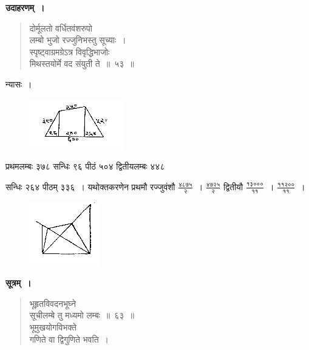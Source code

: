 \documentclass[11pt, openany]{book}
\begin{document}
 \textbf{उदाहरणम्~।} 
\begin{quote}
    \bqt 
दोर्मूलतो वर्धितवंशरुपो \\
लम्बो भुजो रज्जुनिभस्तु सूच्याः~।\\
स्पृष्ट्वाग्रमग्रेऽत्र विवृद्धिभाजोः\\
मिथस्तयोर्मे वद संयुती ते~॥~५३~॥
\end{quote}

 न्यासः~। 
\vspace{-2mm}

\begin{figure}[h!]
    \centering
    \includegraphics[scale=0.85]{graphics/capture67.png}
\end{figure}
\vspace{-2mm}

 प्रथमलम्बः ३७८ सन्धिः ९६ पीठं ५०४ द्वितीयलम्बः ४४८
\newpage

\noindent सन्धिः २६४ पीठम् ३३६~। यथोक्तकरणेन प्रथमौ रज्जुवंशौ
$\frac{\mbox{४८७५}}{\mbox{२}}$~। $\frac{\mbox{४७२५}}{\mbox{२}}$ द्वितीयौ 
$\frac{\mbox{१३०००}}{\mbox{११}}$~। $\frac{\mbox{११२००}}{\mbox{११}}$~। 
\vspace{-2mm}

\begin{figure}[h!]
    \centering
    \includegraphics[scale=0.85]{graphics/capture68.png}
\end{figure}
\vspace{-2mm}

 \textbf{सूत्रम्~।} 
\begin{quote}
    \bs 
     भूहृतविवदनभूघ्ने \\
     सूचीलम्बे तु मध्यमो लम्बः~॥~६३~॥ \\
भूमुखयोगविभक्ते \\
गणिते वा द्विगुणिते भवति~।
\end{quote}
\end{document}
